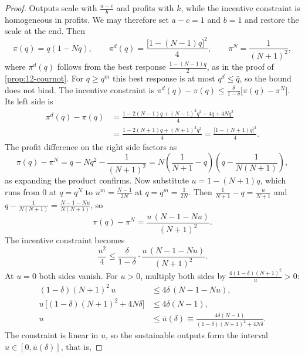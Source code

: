 \begin{proof}
Outputs scale with $\frac{a - c}{b}$ and profits with $k$, while the incentive constraint is homogeneous in profits.
We may therefore set $a - c = 1$ and $b = 1$ and restore the scale at the end. Then
\begin{equation*}
\pi(q) = q(1 - Nq), \qquad \pi^d(q) = \frac{\bigl[1 - (N - 1)q\bigr]^2}{4}, \qquad \pi^N = \frac{1}{(N + 1)^2} ,
\end{equation*}
where $\pi^d(q)$ follows from the best response $\frac{1 - (N - 1)q}{2}$, as in the proof of \cref{prop:12-cournot}.
For $q \ge q^m$ this best response is at most $q^d \le \bar q$, so the bound does not bind.
The incentive constraint is $\pi^d(q) - \pi(q) \le \frac{\delta}{1 - \delta}\bigl[\pi(q) - \pi^N\bigr]$. Its left side
is
\begin{align*}
\pi^d(q) - \pi(q)
&= \frac{1 - 2(N - 1)q + (N - 1)^2q^2 - 4q + 4Nq^2}{4} \\
&= \frac{1 - 2(N + 1)q + (N + 1)^2q^2}{4}
= \frac{\bigl[1 - (N + 1)q\bigr]^2}{4} .
\end{align*}
The profit difference on the right side factors as
\begin{equation*}
\pi(q) - \pi^N = q - Nq^2 - \frac{1}{(N + 1)^2} = N\left(\frac{1}{N + 1} - q\right)\left(q - \frac{1}{N(N + 1)}\right) ,
\end{equation*}
as expanding the product confirms. Now substitute $u = 1 - (N + 1)q$, which runs from $0$ at $q = q^N$ to
$u^m = \frac{N - 1}{2N}$ at $q = q^m = \frac{1}{2N}$. Then $\frac{1}{N + 1} - q = \frac{u}{N + 1}$ and
$q - \frac{1}{N(N + 1)} = \frac{N - 1 - Nu}{N(N + 1)}$, so
\begin{equation*}
\pi(q) - \pi^N = \frac{u\,(N - 1 - Nu)}{(N + 1)^2} .
\end{equation*}
The incentive constraint becomes
\begin{equation*}
\frac{u^2}{4} \le \frac{\delta}{1 - \delta}\cdot\frac{u\,(N - 1 - Nu)}{(N + 1)^2} .
\end{equation*}
At $u = 0$ both sides vanish. For $u > 0$, multiply both sides by $\frac{4(1 - \delta)(N + 1)^2}{u} > 0$:
\begin{align*}
(1 - \delta)(N + 1)^2\,u &\le 4\delta\,(N - 1 - Nu) , \\
u\,\bigl[(1 - \delta)(N + 1)^2 + 4N\delta\bigr] &\le 4\delta(N - 1) , \\
u &\le \bar u(\delta) \equiv \frac{4\delta(N - 1)}{(1 - \delta)(N + 1)^2 + 4N\delta} .
\end{align*}
The constraint is linear in $u$, so the sustainable outputs form the interval $u \in [0, \bar u(\delta)]$, that is,

\end{proof}
